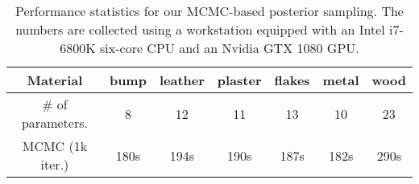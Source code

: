 \begin{table}[h]
	\centering
	\caption[Performance]{\label{tab:bayesian:performance}
		Performance statistics for our MCMC-based posterior sampling.
		The numbers are collected using a workstation equipped with an Intel i7-6800K six-core CPU and an Nvidia GTX 1080 GPU.
	}
	\addtolength{\tabcolsep}{3pt}
	\begin{tabular}{c|cccccc}
		Material & bump & leather & plaster & flakes & metal & wood\\
		\hline
		\# of parameters. & 8 & 12 & 11 & 13 & 10 & 23\\
		MCMC (1k iter.) & 180s & 194s & 190s & 187s & 182s & 290s
	\end{tabular}
\end{table}

